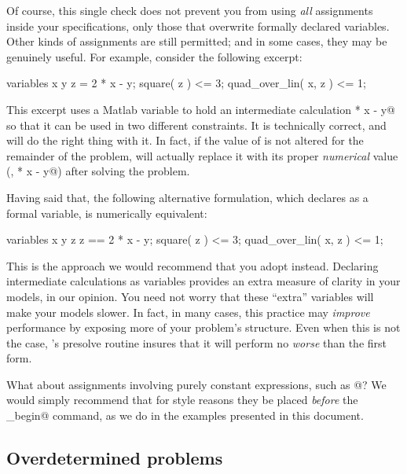 \documentclass[12pt]{article}
\begin{document}
Of course, this single check does not prevent you from using \emph{all} assignments 
inside your \cvx specifications, only those that overwrite formally declared variables.
Other kinds of assignments are still permitted; and in some cases, they may be genuinely
useful. For example, consider the following \cvx excerpt:
\begin{code}
	variables x y
	z = 2 * x - y;
	square( z ) <= 3;
	quad_over_lin( x, z ) <= 1;
\end{code}
This excerpt uses a Matlab variable \verb@z@ to hold an
intermediate calculation  * x - y@ so that it can be used in two different constraints.
It is technically correct, and \cvx will do the right thing with it. In fact, if the value
of \verb@z@ is not altered for the remainder of the problem, \cvx will actually replace it
with its proper \emph{numerical} value (\ie,  * x - y@) after solving the problem.

Having said that, the following alternative formulation, which declares \verb@z@
as a formal variable, is numerically equivalent:
\begin{code}
	variables x y z
	z == 2 * x - y;
	square( z ) <= 3;
	quad_over_lin( x, z ) <= 1;
\end{code}
This is the approach we would recommend that you adopt instead. Declaring intermediate
calculations as variables provides an extra measure of clarity in your models, in our
opinion. You need not worry that these ``extra'' variables will make your models slower. 
In fact, in many cases, this
practice may \emph{improve} performance by exposing more of your problem's structure.
Even when this is not the case, \cvx's presolve routine insures that it will perform
no \emph{worse} than the first form.

What about assignments involving purely constant expressions, such as @?
We would simply recommend that for style reasons they be placed \emph{before}
the \verb@cvx_begin@ command, as we do in the examples presented in this document.

\subsection{Overdetermined problems}
\label{sec:overdetermined}
\end{document}
